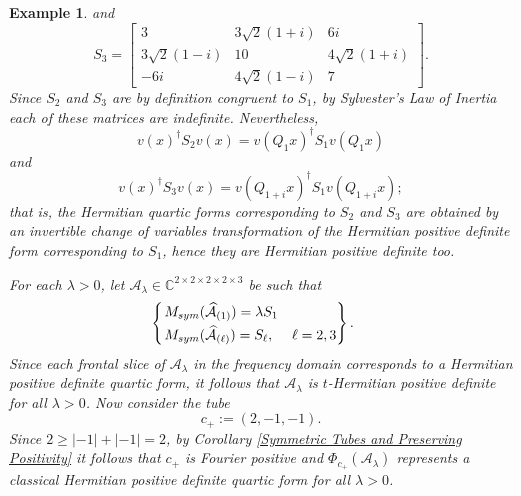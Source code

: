 \documentclass[11pt]{article}
\newtheorem{example}[theorem]{Example}
\begin{document}
\begin{example}
    and 
    \[S_3 = \left[\begin{array}{ccc}
        3 & 3\sqrt{2}(1+i) & 6i \\
        3\sqrt{2}(1-i) & 10 & 4\sqrt{2}(1+i) \\
        -6i & 4\sqrt{2}(1-i) & 7
    \end{array}\right].\]
    Since $S_2$ and $S_3$ are by definition congruent to $S_1$, by Sylvester's Law of Inertia each of these matrices are indefinite. Nevertheless,  
    \[v(x)^{\dagger}S_2v(x) = v(Q_1x)^{\dagger}S_1v(Q_1x)\]
    and 
    \[v(x)^{\dagger}S_3v(x) = v(Q_{1+i}x)^{\dagger}S_1v(Q_{1+i}x);\]
    that is, the Hermitian quartic forms corresponding to $S_2$ and $S_3$ are obtained by an invertible change of variables transformation of the Hermitian positive definite form corresponding to $S_1$, hence they are Hermitian positive definite too.  

    For each $\lambda > 0$, let $\mathcal{A}_{\lambda}\in \mathbb{C}^{2\times 2\times 2\times 2\times 3}$ be such that 
    \[\begin{cases}
        \begin{rcases}
            M_{sym}(\widehat{\mathcal{A}}_{(1)}) = \lambda S_1 \\
            M_{sym}(\widehat{\mathcal{A}}_{(\ell)}) = S_{\ell}, & \ell = 2,3
        \end{rcases}. 
    \end{cases}\]
    Since each frontal slice of $\mathcal{A}_{\lambda}$ in the frequency domain corresponds to a Hermitian positive definite quartic form, it follows that $\mathcal{A}_{\lambda}$ is $t$-Hermitian positive definite for all $\lambda > 0$. Now consider the tube 
    \[c_+ := (2,-1,-1).\]
    Since $2 \geq |-1|+|-1| = 2$, by Corollary \ref{Symmetric Tubes and Preserving Positivity} it follows that $c_+$ is Fourier positive and $\Phi_{c_+}(\mathcal{A}_{\lambda})$ represents a classical Hermitian positive definite quartic form for all $\lambda > 0$. 
    

\end{example}
\end{document}
